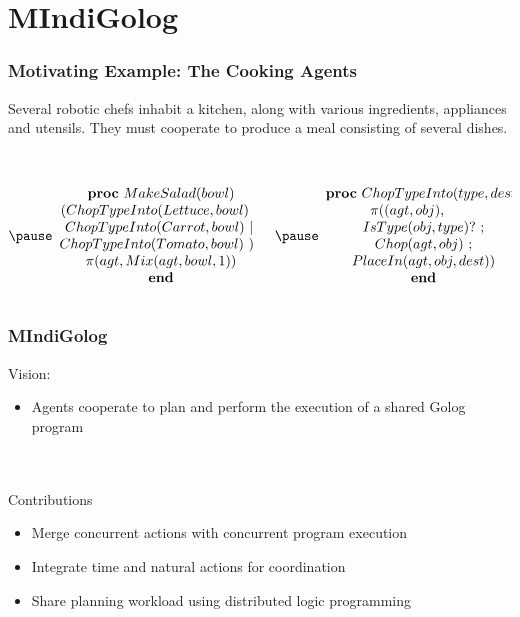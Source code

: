 \documentclass{beamer}
\begin{document}
\section{MIndiGolog}

\begin{frame}
\frametitle{Motivating Example: The Cooking Agents}
Several robotic chefs inhabit a kitchen, along with various ingredients,
appliances and utensils.  They must cooperate to produce a meal consisting
of several dishes.\\
\ \\
\pause
\begin{columns}
  \begin{column}{0.5\textwidth}
\[
\pause
\begin{array}{c}
\mathbf{proc}\ MakeSalad(bowl)\\
(ChopTypeInto(Lettuce,bowl)\ ||\\
ChopTypeInto(Carrot,bowl)\ ||\\
ChopTypeInto(Tomato,bowl)\ )\ ;\\
\pi(agt, Mix(agt,bowl,1))\\
\mathbf{end}\end{array}\]
  \end{column}
  \begin{column}{0.5\textwidth}
\[
\pause
\begin{array}{c}
\mathbf{proc}\ ChopTypeInto(type,dest)\\
\pi((agt,obj), \ \ \ \ \ \ \ \\
IsType(obj,type)?\ ;\\
Chop(agt,obj)\ ;\\
PlaceIn(agt,obj,dest))\\
\mathbf{end}\end{array}\]
  \end{column}
\end{columns}
\end{frame}

\begin{frame}
\frametitle{MIndiGolog}
Vision:
\begin{itemize}
\item Agents cooperate to plan and perform the execution of a shared Golog program
\end{itemize}
\ \\
\ \\
Contributions
\begin{itemize}
\item Merge concurrent actions with concurrent program execution
\item Integrate time and natural actions for coordination
\item Share planning workload using distributed logic programming
\end{itemize}
\end{frame}
\end{document}

